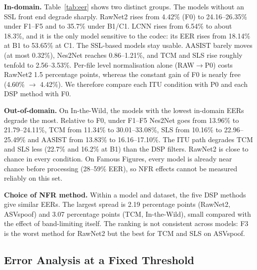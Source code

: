 \documentclass[conference]{IEEEtran}
\begin{document}
\textbf{In-domain.} Table~\ref{tab:eer} shows two distinct groups. The
models without an SSL front end degrade sharply. RawNet2 rises from 4.42\%
(F0) to 24.16--26.35\% under F1--F5 and to 35.7\% under B1/C1. LCNN rises
from 6.54\% to about 18.3\%, and it is the only model sensitive to the
codec: its EER rises from 18.14\% at B1 to 53.65\% at C1. The SSL-based
models stay usable. AASIST barely moves (at most 0.32\%), Nes2Net reaches
0.86--1.21\%, and TCM and SLS rise roughly tenfold to 2.56--3.53\%. Per-file
level normalisation alone (RAW$\rightarrow$P0) costs RawNet2 1.5
percentage points, whereas the constant gain of F0 is nearly free (4.60\%
$\rightarrow$ 4.42\%). We therefore compare each ITU condition with P0 and
each DSP method with F0.

\textbf{Out-of-domain.} On In-the-Wild, the models with the lowest
in-domain EERs degrade the most. Relative to F0, under F1--F5 Nes2Net goes
from 13.96\% to 21.79--24.11\%, TCM from 11.34\% to 30.01--33.08\%, SLS from
10.16\% to 22.96--25.49\% and AASIST from 13.83\% to 16.16--17.10\%. The ITU
path degrades TCM and SLS less (22.7\% and 16.2\% at B1) than the DSP
filters. RawNet2 is close to chance in every condition. On Famous Figures,
every model is already near chance before processing (28--59\% EER), so
NFR effects cannot be measured reliably on this set.

\textbf{Choice of NFR method.} Within a model and dataset, the five DSP
methods give similar EERs. The largest spread is 2.19 percentage points
(RawNet2, ASVspoof) and 3.07 percentage points (TCM, In-the-Wild), small
compared with the effect of band-limiting itself. The ranking is not
consistent across models: F3 is the worst method for RawNet2 but the best
for TCM and SLS on ASVspoof.

\subsection{Error Analysis at a Fixed Threshold}
\end{document}
